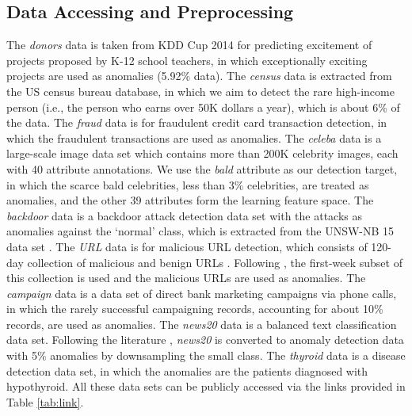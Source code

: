\documentclass[sigconf]{acmart}
\begin{document}
\subsection{Data Accessing and Preprocessing}\label{sec:preprocessing}
The \textit{donors} data is taken from KDD Cup 2014 for predicting excitement of projects proposed by K-12 school teachers, in which exceptionally exciting projects are used as anomalies (5.92\% data). The \textit{census} data is extracted from the US census bureau database, in which we aim to detect the rare high-income person (i.e., the person who earns over 50K dollars a year), which is about 6\% of the data. The \textit{fraud} data is for fraudulent credit card transaction detection, in which the fraudulent transactions are used as anomalies. The \textit{celeba} data is a large-scale image data set which contains more than 200K celebrity images, each with 40 attribute annotations. We use the \textit{bald} attribute as our detection target, in which the scarce bald celebrities, less than 3\% celebrities, are treated as anomalies, and the other 39 attributes form the learning feature space. The \textit{backdoor} data is a backdoor attack detection data set with the attacks as anomalies against the `normal' class, which is extracted from the UNSW-NB 15 data set \cite{moustafa2015nb15}. The \textit{URL} data is for malicious URL detection, which consists of 120-day collection of malicious and benign URLs \cite{ma2009url}. Following \cite{pang2018repen}, the first-week subset of this collection is used and the malicious URLs are used as anomalies. The \textit{campaign} data is a data set of direct bank marketing campaigns via phone calls, in which the rarely successful campaigning records, accounting for about 10\% records, are used as anomalies. The \textit{news20} data is a balanced text classification data set. Following the literature \cite{keller2012hics,pang2018repen}, \textit{news20} is converted to anomaly detection data with 5\% anomalies by downsampling the small class. The \textit{thyroid} data is a disease detection data set, in which the anomalies are the patients diagnosed with hypothyroid. All these data sets can be publicly accessed via the links provided in Table \ref{tab:link}.
\end{document}
